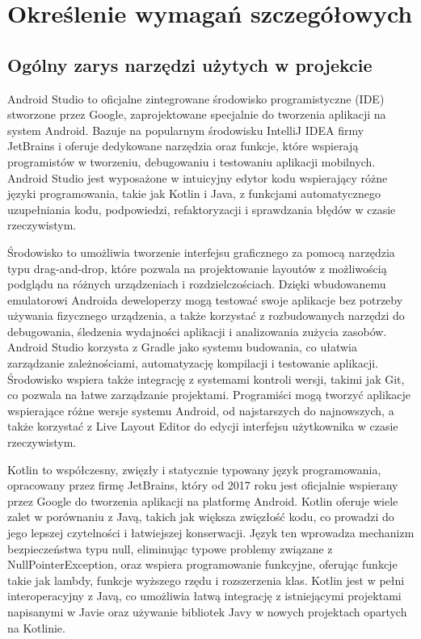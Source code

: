\newpage
\section{Określenie wymagań szczegółowych}		%

\subsection{Ogólny zarys narzędzi użytych w projekcie}

Android Studio to oficjalne zintegrowane środowisko programistyczne (IDE) stworzone przez Google, zaprojektowane specjalnie do tworzenia aplikacji na system Android. Bazuje na popularnym środowisku IntelliJ IDEA firmy JetBrains i oferuje dedykowane narzędzia oraz funkcje, które wspierają programistów w tworzeniu, debugowaniu i testowaniu aplikacji mobilnych. Android Studio jest wyposażone w intuicyjny edytor kodu wspierający różne języki programowania, takie jak Kotlin i Java, z funkcjami automatycznego uzupełniania kodu, podpowiedzi, refaktoryzacji i sprawdzania błędów w czasie rzeczywistym.

Środowisko to umożliwia tworzenie interfejsu graficznego za pomocą narzędzia typu drag-and-drop, które pozwala na projektowanie layoutów z możliwością podglądu na różnych urządzeniach i rozdzielczościach. Dzięki wbudowanemu emulatorowi Androida deweloperzy mogą testować swoje aplikacje bez potrzeby używania fizycznego urządzenia, a także korzystać z rozbudowanych narzędzi do debugowania, śledzenia wydajności aplikacji i analizowania zużycia zasobów. Android Studio korzysta z Gradle jako systemu budowania, co ułatwia zarządzanie zależnościami, automatyzację kompilacji i testowanie aplikacji. Środowisko wspiera także integrację z systemami kontroli wersji, takimi jak Git, co pozwala na łatwe zarządzanie projektami. Programiści mogą tworzyć aplikacje wspierające różne wersje systemu Android, od najstarszych do najnowszych, a także korzystać z Live Layout Editor do edycji interfejsu użytkownika w czasie rzeczywistym.

Kotlin to współczesny, zwięzły i statycznie typowany język programowania, opracowany przez firmę JetBrains, który od 2017 roku jest oficjalnie wspierany przez Google do tworzenia aplikacji na platformę Android. Kotlin oferuje wiele zalet w porównaniu z Javą, takich jak większa zwięzłość kodu, co prowadzi do jego lepszej czytelności i łatwiejszej konserwacji. Język ten wprowadza mechanizm bezpieczeństwa typu null, eliminując typowe problemy związane z NullPointerException, oraz wspiera programowanie funkcyjne, oferując funkcje takie jak lambdy, funkcje wyższego rzędu i rozszerzenia klas. Kotlin jest w pełni interoperacyjny z Javą, co umożliwia łatwą integrację z istniejącymi projektami napisanymi w Javie oraz używanie bibliotek Javy w nowych projektach opartych na Kotlinie.

